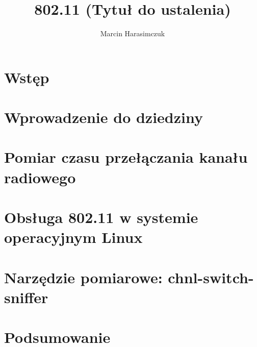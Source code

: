 \documentclass[11pt,a4paper,oneside]{report}
\begin{document}
\title{ 802.11 (Tytuł do ustalenia) }
\author{ Marcin Harasimczuk }
\maketitle

\tableofcontents

\newpage
\thispagestyle{empty}
\mbox{}


\section{Wstęp}


\section{Wprowadzenie do dziedziny}


\section{Pomiar czasu przełączania kanału radiowego}


\section{Obsługa 802.11 w systemie operacyjnym Linux}


\section{Narzędzie pomiarowe: chnl-switch-sniffer}


\section{Podsumowanie}


\nocite{*}

\end{document}
